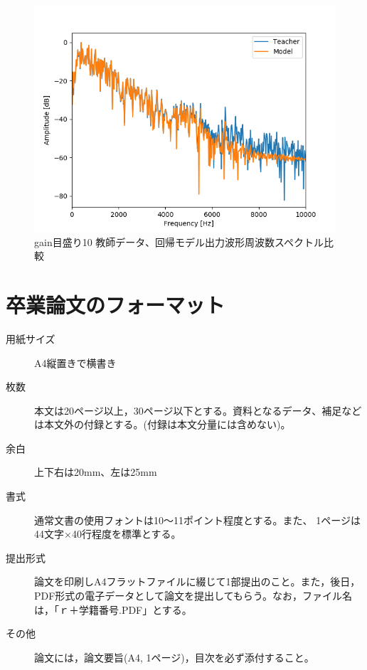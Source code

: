 \documentclass{jreport}		%
\begin{document}
\begin{figure}[htbp]
 \begin{center}
  \includegraphics[width=150mm]{gain10_fft_hikaku.png}
 \end{center}
 \caption{gain目盛り10 教師データ、回帰モデル出力波形周波数スペクトル比較}
 \label{fig:one}
\end{figure}

\section{卒業論文のフォーマット}%
\begin{description}
\item[用紙サイズ] A4縦置きで横書き
\item[枚数] 本文は20ページ以上，30ページ以下とする。資料となるデータ、補足などは本文外の付録とする。(付録は本文分量には含めない)。
\item[余白] 上下右は20mm、左は25mm
\item[書式] 通常文書の使用フォントは10〜11ポイント程度とする。また、
1ページは44文字×40行程度を標準とする。
\item[提出形式] 論文を印刷しA4フラットファイルに綴じて1部提出のこと。また，後日，PDF形式の電子データとして論文を提出してもらう。なお，ファイル名は，「ｒ＋学籍番号.PDF」とする。
\item[その他] 論文には，論文要旨(A4, 1ページ)，目次を必ず添付すること。
\end{description}
\end{document}
